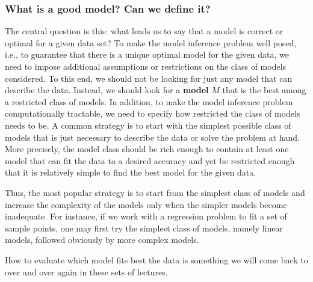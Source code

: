 \documentclass{beamer}
\begin{document}
\begin{frame}
\frametitle{What is a good model? Can we define it?}

The central question is this: what leads us to say that a model is correct or
optimal for a given data set? To make the model inference problem well posed, i.e.,
to guarantee that there is a unique optimal model for the given data, we need to
impose additional assumptions or restrictions on the class of models considered. To
this end, we should not be looking for just any model that can describe the data.
Instead, we should look for a \textbf{model} $M$ that is the best among a restricted class
of models. In addition, to make the model inference problem computationally
tractable, we need to specify how restricted the class of models needs to be. A
common strategy is to start 
with the simplest possible class of models that is just necessary to describe the data
or solve the problem at hand. More precisely, the model class should be rich enough
to contain at least one model that can fit the data to a desired accuracy and yet be
restricted enough that it is relatively simple to find the best model for the given data.

Thus, the most popular strategy is to start from the
simplest class of models and increase the complexity of the models only when the
simpler models become inadequate. For instance, if we work with a regression problem to fit a set of sample points, one
may first try the simplest class of models, namely linear models, followed obviously by more complex models.

How to evaluate which model fits best the data is something we will come back to over and over again in these sets of lectures.
\end{frame}
\end{document}
